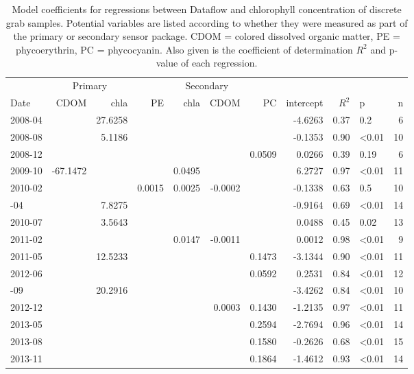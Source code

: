 \begin{table}

\caption{\label{tab:}Model coefficients for regressions between Dataflow and chlorophyll concentration of discrete grab samples. Potential variables are listed according to whether they were measured as part of the primary or secondary sensor package. CDOM = colored dissolved organic matter, PE = phycoerythrin, PC = phycocyanin. Also given is the coefficient of determination $R^2$ and p-value of each regression.}
\centering
\begin{tabular}[t]{lrrrrrrrrlr}
\toprule
\multicolumn{1}{c}{ } & \multicolumn{2}{c}{Primary} & \multicolumn{4}{c}{Secondary} \\ \cmidrule(l{2pt}r{2pt}){2-3} \cmidrule(l{2pt}r{2pt}){4-7}
Date & CDOM & chla & PE & chla & CDOM & PC & intercept & $R^2$ & p & n\\
\midrule
2008-04 &  & 27.6258 &  &  &  &  & -4.6263 & 0.37 & 0.2 & 6\\
2008-08 &  & 5.1186 &  &  &  &  & -0.1353 & 0.90 & \textless0.01 & 10\\
2008-12 &  &  &  &  &  & 0.0509 & 0.0266 & 0.39 & 0.19 & 6\\
2009-10 & -67.1472 &  &  & 0.0495 &  &  & 6.2727 & 0.97 & \textless0.01 & 11\\
2010-02 &  &  & 0.0015 & 0.0025 & -0.0002 &  & -0.1338 & 0.63 & 0.5 & 10\\
\addlinespace
2010-04 &  & 7.8275 &  &  &  &  & -0.9164 & 0.69 & \textless0.01 & 14\\
2010-07 &  & 3.5643 &  &  &  &  & 0.0488 & 0.45 & 0.02 & 13\\
2011-02 &  &  &  & 0.0147 & -0.0011 &  & 0.0012 & 0.98 & \textless0.01 & 9\\
2011-05 &  & 12.5233 &  &  &  & 0.1473 & -3.1344 & 0.90 & \textless0.01 & 11\\
2012-06 &  &  &  &  &  & 0.0592 & 0.2531 & 0.84 & \textless0.01 & 12\\
\addlinespace
2012-09 &  & 20.2916 &  &  &  &  & -3.4262 & 0.84 & \textless0.01 & 10\\
2012-12 &  &  &  &  & 0.0003 & 0.1430 & -1.2135 & 0.97 & \textless0.01 & 11\\
2013-05 &  &  &  &  &  & 0.2594 & -2.7694 & 0.96 & \textless0.01 & 14\\
2013-08 &  &  &  &  &  & 0.1580 & -0.2626 & 0.68 & \textless0.01 & 15\\
2013-11 &  &  &  &  &  & 0.1864 & -1.4612 & 0.93 & \textless0.01 & 14\\

\end{tabular}
\end{table}
